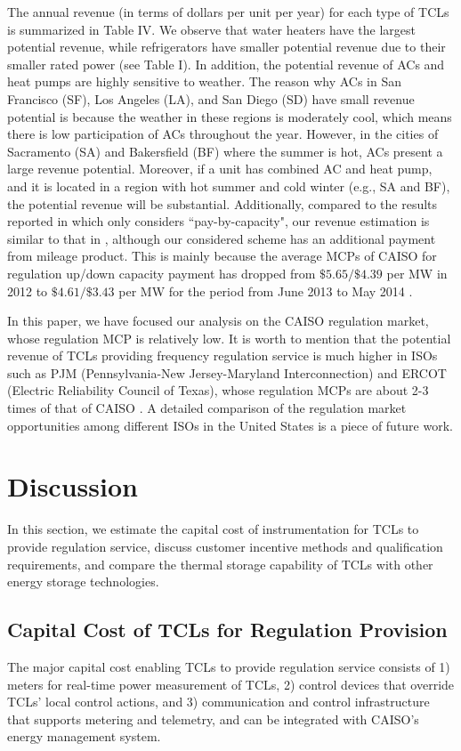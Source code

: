 \documentclass[onecolumn,journal]{IEEEtran}
\newcommand{\cut}[1]{}
\begin{document}
The annual revenue  (in terms of dollars per unit per year) for each type of \acp{TCL} is summarized in Table IV. We observe that water heaters have the largest potential revenue, while refrigerators have smaller potential revenue due to their smaller rated power (see Table I). In addition, the potential revenue of ACs and heat pumps are highly sensitive to weather. The reason why ACs in San Francisco (SF), Los Angeles (LA), and San Diego (SD) have small revenue potential is because the weather in these regions is moderately cool, which means there is low participation of ACs throughout the year. However, in the cities of Sacramento (SA) and Bakersfield (BF) where the summer is hot, ACs present a large revenue potential. Moreover, if a unit has combined AC and heat pump, and it is located in a region with hot summer and cold winter (e.g., SA and BF), the potential revenue will be substantial.  Additionally, compared to the results reported in \cite{HH_BS_KP_TV_ACC:2014} which only considers ``pay-by-capacity", our revenue estimation is similar to that in \cite{HH_BS_KP_TV_ACC:2014}, although our considered scheme has an additional payment from mileage product. This is mainly because the average MCPs of CAISO for regulation up/down  capacity payment has dropped from $\$5.65/\$4.39$ per MW in 2012 to $\$4.61/\$3.43$ per MW for the period from June 2013 to May 2014 \cite{OASIS}.


In this paper, we have focused our analysis on the CAISO regulation market, whose regulation MCP is relatively low. It is worth to mention that the potential revenue of TCLs providing frequency regulation service is much higher in ISOs such as PJM (Pennsylvania-New Jersey-Maryland Interconnection) and ERCOT (Electric Reliability Council of Texas), whose regulation MCPs are about 2-3 times of that of CAISO \cite{ERCOT_regulation, PJM_price}. A detailed comparison of the regulation market opportunities among different ISOs in the United States is a piece of future work.


\section{Discussion}
\label{sec:econo}
In this section, we estimate the capital cost of instrumentation for \acp{TCL} to provide regulation service, discuss customer incentive methods and qualification requirements, and compare the thermal storage capability of \acp{TCL} with other energy storage technologies. 

\subsection{Capital Cost of \acp{TCL} for Regulation Provision}\label{sec:cost}
The major capital cost enabling \acp{TCL} to provide regulation service consists of 1) meters for real-time power measurement of \acp{TCL}, 2) control devices that override  \acp{TCL}' local control actions,   and 3) communication and control infrastructure that supports metering and telemetry, and can be integrated with \ac{CAISO}'s energy management system. \cut{ In particular, the design, acquisition, and installation of the \ac{CAISO}-approved communication and control equipment shall be under the control of the \ac{CAISO}. }
\end{document}
